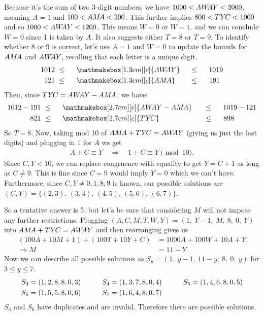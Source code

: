 \begin{solution}[A]
    Because it's the sum of two 3-digit numbers, we have $1000<A\mkern0mu W\mkern-4mu A\mkern0mu Y<2000$, meaning $A=1$ and $100<A\mkern0mu M\mkern-2mu A<200$. This further implies $800<T\mkern1mu Y\mkern-2mu C<1000$ and so $1000<A\mkern0mu W\mkern-4mu A\mkern0mu Y<1200$. This means $W=0$ or $W=1$, and we can conclude $W=0$ since 1 is taken by $A$. It also suggests either $T=8$ or $T=9$. To identify whether $8$ or $9$ is correct, let's use $A=1$ and $W=0$ to update the bounds for $A\mkern0mu M\mkern-2mu A$ and $A\mkern0mu W\mkern-4mu A\mkern0mu Y$, recalling that each letter is a unique digit.
    \begin{alignat*}{7}
        1012\ &\leq& \ \ &\mathmakebox[1.3cm][c]{\AWAY}& \ &\leq& \ \ 1019 \\
         121\ &\leq& \ \ &\mathmakebox[1.3cm][c]{\AMA}& \ &\leq& \ \ 191 \; \,
    \end{alignat*}
    Then, since $T\mkern1mu Y\mkern-2mu C = A\mkern0mu W\mkern-4mu A\mkern0mu Y - A\mkern0mu M\mkern-2mu A$, we have:
    \begin{alignat*}{7}
        1012 - 191 \ &\leq& \ \ &\mathmakebox[2.7cm][c]{\AWAY - \AMA}& \ &\leq& \ \ 1019 - 121\\
              821 \ &\leq& \ &\mathmakebox[2.7cm][c]{\TYC}& \ \ &\leq& \ \ 898 \qquad \quad \,
    \end{alignat*}
    So $T=8$. Now, taking mod 10 of $A\mkern0mu M\mkern-2mu A + T\mkern1mu Y\mkern-2mu C = A\mkern0mu W\mkern-4mu A\mkern0mu Y$ (giving us just the last digits) and plugging in $1$ for $A$ we get
    \begin{align*}
        A + C \equiv Y \quad \Rightarrow \quad
        1 + C \equiv Y \pmod{\!10}\text{.}
    \end{align*}
    Since $C,Y<10$, we can replace congruence with equality to get $Y=C+1$ as long as $C\neq9$. This is fine since $C=9$ would imply $Y=0$ which we can't have. Furthermore, since $C,Y \neq 0,1,8,9$ is known, our possible solutions are $(C,Y)=\{(2,3),\, (3,4),\, (4,5),\, (5,6),\, (6,7)\}$.
    
    So a tentative answer is 5, but let's be sure that considering $M$ will not impose any further restrictions. Plugging $(A,C,M,T,W,Y)=(1,\ Y-1,\ M,\ 8,\ 0,\ Y)$ into $A\mkern0mu M\mkern-2mu A+T\mkern1mu Y\mkern-2mu C=A\mkern0mu W\mkern-4mu A\mkern0mu Y$ and then rearranging gives us    
    \begin{align*}
            (100A + 10M + 1) + (100T + 10Y + C) &= 1000A + 100W + 10A + Y\\ 
            \Rightarrow M &= 11 - Y \text{.}
    \end{align*}
    Now we can describe all possible solutions as $S_y=(1,\ y-1,\ 11-y,\ 8,\ 0,\ y)$ for $3 \leq y \leq 7$.
    \[\begin{array}{l@{\hskip 30pt}l@{\hskip 30pt}l}
    S_3 = (1, 2, 8, 8, 0, 3) & S_4 = (1, 3, 7, 8, 0, 4) & S_5 = (1, 4, 6, 8, 0, 5) \\[1mm]
    S_6 = (1, 5, 5, 8, 0, 6) & S_7 = (1, 6, 4, 8, 0, 7)
    \end{array}\]
    $S_3$ and $S_6$ have duplicates and are invalid. Therefore there are  possible solutions.
\end{solution}

